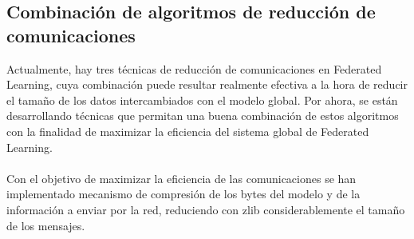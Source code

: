 \subsection{Combinación de algoritmos de reducción de comunicaciones}
Actualmente, hay tres técnicas de reducción de comunicaciones en Federated Learning, cuya combinación puede resultar realmente efectiva a la hora de reducir el tamaño de los datos intercambiados con el modelo global. Por ahora, se están desarrollando técnicas que permitan una buena combinación de estos algoritmos con la finalidad de maximizar la eficiencia del sistema global de Federated Learning.
\\ \\
Con el objetivo de maximizar la eficiencia de las comunicaciones se han implementado mecanismo de compresión de los bytes del modelo y de la información a enviar por la red, reduciendo con zlib considerablemente el tamaño de los mensajes.

